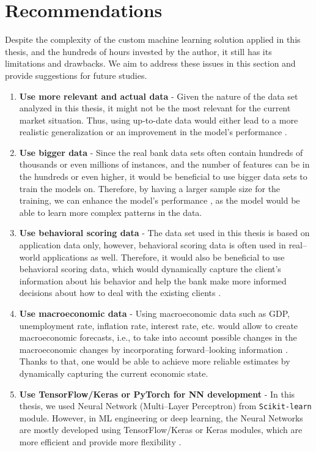 \section{Recommendations}
\label{sec:recommendations}
Despite the complexity of the custom machine learning solution applied in this thesis, and the hundreds of hours invested by the author, it still has its limitations and drawbacks. We aim to address these issues in this section and provide suggestions for future studies.
\begin{enumerate}\setlength\itemsep{0em}
    \item \textbf{Use more relevant and actual data} - Given the nature of the data set analyzed in this thesis, it might not be the most relevant for the current market situation.
    Thus, using up-to-date data would either lead to a more realistic generalization \citep {kumar2021blockchain} or an improvement in the model's performance \citep{karatas2020increasing}.
    \item \textbf{Use bigger data} - Since the real bank data sets often contain hundreds of thousands or even millions of instances, and the number of features can be in the hundreds or even higher, it would be beneficial to use bigger data sets to train the models on.
    Therefore, by having a larger sample size for the training, we can enhance the model's performance \citep{ng2020influence}, as the model would be able to learn more complex patterns in the data.
    \item \textbf{Use behavioral scoring data} - The data set used in this thesis is based on application data only, however, behavioral scoring data is often used in real--world applications as well.
    Therefore, it would also be beneficial to use behavioral scoring data, which would dynamically capture the client's information about his behavior and help the bank make more informed decisions about how to deal with the existing clients \citep{li2012overview}.
    \item \textbf{Use macroeconomic data} - Using macroeconomic data such as GDP, unemployment rate, inflation rate, interest rate, etc. would allow to create macroeconomic forecasts, i.e., to take into account possible changes in the macroeconomic changes by incorporating forward--looking information \citep{jakubik2007macroeconomic}.
    Thanks to that, one would be able to achieve more reliable estimates by dynamically capturing the current economic state.
    \item \textbf{Use TensorFlow/Keras or PyTorch for NN development} - In this thesis, we used Neural Network (Multi--Layer Perceptron) from \lstinline{Scikit-learn} module. However, in ML engineering or deep learning, the Neural Networks are mostly developed using TensorFlow/Keras or Keras modules, which are more efficient and provide more flexibility \citep{gevorkyan2019review}.

\end{enumerate}
